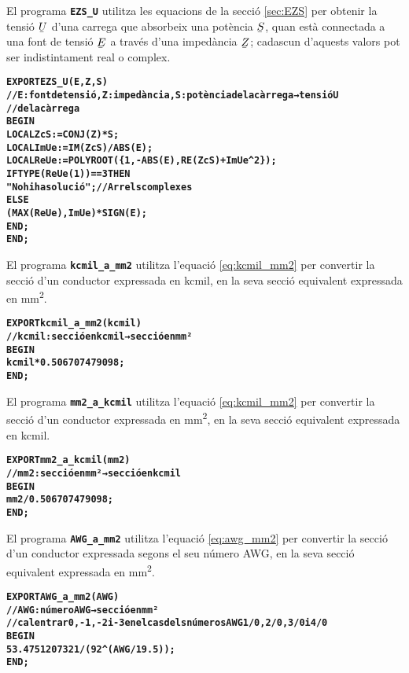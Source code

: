 El programa \texttt{\textbf{EZS\_U}} utilitza les equacions de la secció \vref{sec:EZS} per obtenir la tensió $\cmplx{U}$ d'una carrega que absorbeix una potència $\cmplx{S}$, quan està connectada a una font de tensió $\cmplx{E}$ a través d'una impedància $\cmplx{Z}$; cadascun d'aquests valors pot ser indistintament real o complex.
\vspace{-6mm}
\begin{alltt}
\bfseries
{}
    EXPORT EZS_U(E,Z,S)
    // E:font de tensió, Z:impedància, S:potència de la càrrega → tensió U
    // de la càrrega
    BEGIN
      LOCAL ZcS:=CONJ(Z)*S;
      LOCAL ImUe:=IM(ZcS)/ABS(E);
      LOCAL ReUe:=POLYROOT(\{1,-ABS(E),RE(ZcS)+ImUe^2\});
      IF TYPE(ReUe(1))==3 THEN
        "No hi ha solució"; // Arrels complexes
      ELSE
        (MAX(ReUe),ImUe)*SIGN(E);
      END;
    END;
\end{alltt}


El programa \texttt{\textbf{kcmil\_a\_mm2}} utilitza l'equació \eqref{eq:kcmil_mm2} per convertir la secció d'un conductor expressada en \si{kcmil}, en la seva secció equivalent expressada en \si{mm^2}.
\vspace{-6mm}
\begin{alltt}
\bfseries
{}
    EXPORT kcmil_a_mm2(kcmil)
    // kcmil:secció en kcmil → secció en mm²
    BEGIN
      kcmil*0.506707479098;
    END;
\end{alltt}

El programa \texttt{\textbf{mm2\_a\_kcmil}} utilitza l'equació \eqref{eq:kcmil_mm2} per convertir la secció d'un conductor expressada en \si{mm^2}, en la seva secció equivalent expressada en \si{kcmil}.
\vspace{-6mm}
\begin{alltt}
\bfseries
{}
    EXPORT mm2_a_kcmil(mm2)
    // mm2:secció en mm² → secció en kcmil
    BEGIN
      mm2/0.506707479098;
    END;
\end{alltt}

El programa \texttt{\textbf{AWG\_a\_mm2}} utilitza l'equació \eqref{eq:awg_mm2} per convertir la secció d'un conductor expressada segons el seu número AWG, en la seva secció equivalent expressada en \si{mm^2}.
\vspace{-6mm}
\begin{alltt}
\bfseries
{}
    EXPORT AWG_a_mm2(AWG)
    // AWG:número AWG → secció en mm²
    // cal entrar 0, -1, -2 i -3 en el cas dels números AWG 1/0, 2/0, 3/0 i 4/0
    BEGIN
      53.4751207321/(92^(AWG/19.5));
    END;
\end{alltt}

